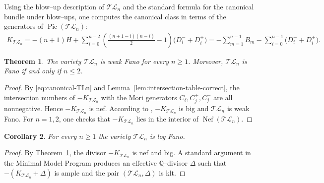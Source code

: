 \documentclass[10pt]{amsart}
\newtheorem{theorem}{Theorem}[section]
\newtheorem{corollary}[theorem]{Corollary}
\theoremstyle{definition}
\newcommand{\Q}{\mathbb{Q}}
\newcommand{\Pic}{\operatorname{Pic}}
\newcommand{\Nef}{\operatorname{Nef}}
\newcommand{\TL}{\mathcal{TL}}
\theoremstyle{plain} %
\begin{document}
Using the blow--up description of $\TL_n$ and the standard formula for the
canonical bundle under blow--ups, one computes the canonical class in terms of
the generators of $\Pic(\TL_n)$:
\begin{equation}\label{eq:canonical-TLn}
\begin{aligned}
K_{\TL_n}=-(n+1)H
 + \sum_{i=0}^{n-2}
   \left(\frac{(n+1-i)(n-i)}{2}-1\right)\bigl(D_i^-+D_i^+\bigr)= -\sum_{m=1}^{n-1} B_m
       -\sum_{i=0}^{n-1}\bigl(D_i^-+D_i^+\bigr).
\end{aligned}
\end{equation}

\begin{theorem}\label{thm:Fano-weakFano}
The variety $\TL_n$ is weak Fano for every $n\ge 1$. Moreover, $\TL_n$ is Fano if
and only if $n\le 2$.
\end{theorem}

\begin{proof}
By \eqref{eq:canonical-TLn} and Lemma~\ref{lem:intersection-table-correct}, the intersection numbers of $-K_{\TL_n}$ with the Mori generators $C_\ell,C_j^+,C_j^-$ are all nonnegative. 
Hence $-K_{\TL_n}$ is nef. According to \cite[Theorem 1.3]{FZ},  %
$-K_{\TL_n}$ is big and $\TL_n$ is weak Fano. For $n=1,2$, one checks that $-K_{\TL_n}$ lies in the interior of $\Nef(\TL_n)$.
\end{proof}

\begin{corollary}\label{prop:log-Fano}
For every $n\ge 1$ the variety $\TL_n$ is log Fano.
\end{corollary}

\begin{proof}
By Theorem~\ref{thm:Fano-weakFano}, the divisor $-K_{\TL_n}$ is nef and big. A standard argument in the Minimal Model Program produces an effective $\Q$--divisor $\Delta$ such that $-(K_{\TL_n}+\Delta)$ is ample and the pair $(\TL_n,\Delta)$ is klt. %
\end{proof}
\end{document}
